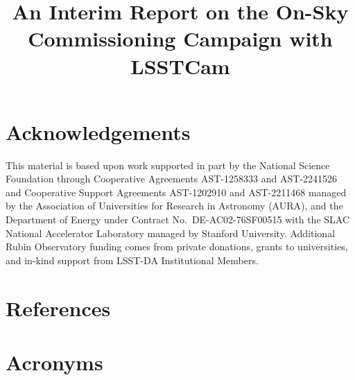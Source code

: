 \documentclass[SE,lsstdraft,authoryear,toc]{lsstdoc}
\title{An Interim Report on the On-Sky Commissioning Campaign with LSSTCam}
\date{\vcsDate}
\begin{document}
\maketitle


\appendix

\section{Acknowledgements}

This material is based upon work supported in part by the National Science Foundation through Cooperative Agreements AST-1258333 and AST-2241526 and Cooperative Support Agreements AST-1202910 and AST-2211468 managed by the Association of Universities for Research in Astronomy (AURA), and the Department of Energy under Contract No.\ DE-AC02-76SF00515 with the SLAC National Accelerator Laboratory managed by Stanford University.
Additional Rubin Observatory funding comes from private donations, grants to universities, and in-kind support from LSST-DA Institutional Members.

\section{References} \label{sec:bib}
\renewcommand{\refname}{} %


\section{Acronyms} \label{sec:acronyms}

\end{document}
